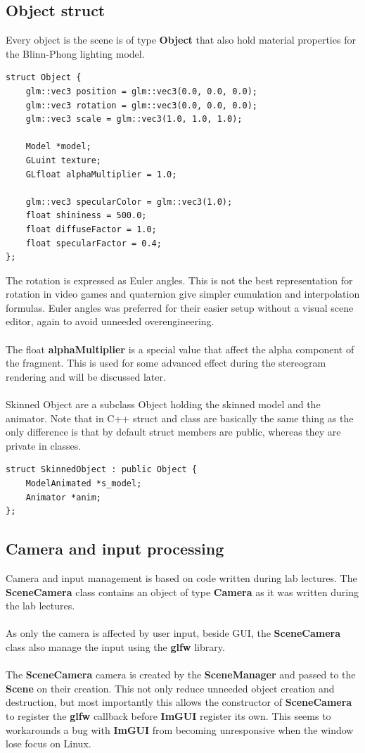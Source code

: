 \documentclass[12pt, a4paper]{article}
\begin{document}
\subsection{Object struct}
Every object is the scene is of type \textbf{Object} that also hold material properties for the Blinn-Phong lighting model.
\begin{lstlisting}[caption={Object struct},captionpos=b]
struct Object {
    glm::vec3 position = glm::vec3(0.0, 0.0, 0.0);
    glm::vec3 rotation = glm::vec3(0.0, 0.0, 0.0);
    glm::vec3 scale = glm::vec3(1.0, 1.0, 1.0);

    Model *model;
    GLuint texture;
    GLfloat alphaMultiplier = 1.0;

    glm::vec3 specularColor = glm::vec3(1.0);
    float shininess = 500.0;
    float diffuseFactor = 1.0;
    float specularFactor = 0.4;
};
\end{lstlisting}
The rotation is expressed as Euler angles. This is not the best representation for rotation in video games and quaternion
give simpler cumulation and interpolation formulas. Euler angles was preferred for their easier setup without a visual
scene editor, again to avoid unneeded overengineering.\\\\
The float \textbf{alphaMultiplier} is a special value that affect the alpha component of the fragment.
This is used for some advanced effect during the stereogram rendering and will be discussed later.\\\\
Skinned Object are a subclass Object holding the skinned model and the animator. Note that in C++ struct and class
are basically the same thing as the only difference is that by default struct members are public, whereas they are private in classes.
\begin{lstlisting}[caption={SkinnedObject struct},captionpos=b]
struct SkinnedObject : public Object {
    ModelAnimated *s_model;
    Animator *anim;
};
\end{lstlisting}

\subsection{Camera and input processing}
Camera and input management is based on code written during lab lectures. The \textbf{SceneCamera} class contains
an object of type \textbf{Camera} as it was written during the lab lectures.\\\\
As only the camera is affected by user input, beside GUI, the \textbf{SceneCamera} class also manage the input
using the \textbf{glfw} library.\\\\
The \textbf{SceneCamera} camera is created by the \textbf{SceneManager} and passed to the \textbf{Scene} on
their creation. This not only reduce unneeded object creation and destruction, but most importantly this allows
the constructor of \textbf{SceneCamera} to register the \textbf{glfw} callback before \textbf{ImGUI} register its own.
This seems to workarounds a bug with \textbf{ImGUI} from becoming unresponsive when the window lose focus on Linux.  
\end{document}
